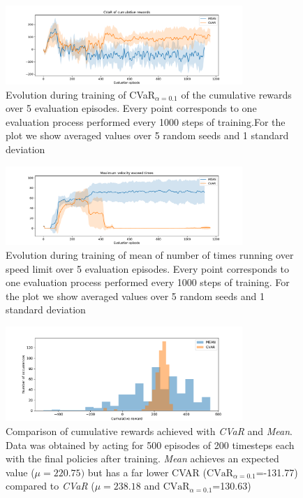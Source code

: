 \begin{figure}[ht]
        \centering
        \includegraphics[width=0.8\textwidth]{images/Cheetah_offpolicy_medium/cvar_train_withstds.pdf}
        \caption{Evolution during training of CVaR$_{\alpha=0.1}$ of the cumulative rewards over 5 evaluation episodes.
        Every point corresponds to one evaluation process performed every 1000 steps of training.For the plot we
        show averaged values over 5 random seeds and 1 standard deviation}
        \label{fig:cvar_cheetah}
    
\end{figure}


\begin{figure}[ht]
    \centering
    \includegraphics[width=0.8\textwidth]{images/Cheetah_offpolicy_medium/times_exceedvel_withstds.pdf}
    \caption{Evolution during training of mean of number of times running over speed limit over 5 evaluation episodes.
    Every point corresponds to one evaluation process performed every 1000 steps of training.
    For the plot we show averaged values over 5 random seeds and 1 standard deviation}
    \label{fig:vel_exceed_cheetah}

\end{figure}

\begin{figure}[ht]
    \centering
    \includegraphics[width=0.8\textwidth]{images/Cheetah_offpolicy_medium/hist_evaluation_numevalsteps200_500eps.pdf}
    \caption{Comparison of cumulative rewards achieved with \textit{CVaR} and \textit{Mean}.
    Data was obtained by acting for 500 episodes of 200 timesteps each with the final policies after training.
    \textit{Mean} achieves an expected value  ($\mu=220.75)$  but 
    has a far lower CVAR ($\text{CVaR}_{\alpha= 0.1}$=-131.77) compared to
    \textit{CVaR} ($\mu=238.18$ and $\text{CVaR}_{\alpha= 0.1}$=130.63)}
    \label{fig:hist_cum_rewards200steps_cheetah}
\end{figure}

